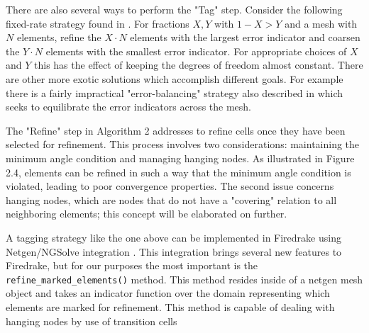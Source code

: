 \documentclass[]{interact}
\theoremstyle{plain}%
\theoremstyle{definition}
\theoremstyle{remark}
\begin{document}
There are also several ways to perform the "Tag" step. Consider the following fixed-rate strategy found in \citet[Chapter 4]{bangerth_adaptive_2003}. For fractions $X, Y$ with $1 - X > Y$ and a mesh with $N$ elements, refine the $X\cdot N$ elements with the largest error indicator and coarsen the $Y\cdot N$ elements with the smallest error indicator. For appropriate choices of $X$ and $Y$ this has the effect of keeping the degrees of freedom almost constant. There are other more exotic solutions which accomplish different goals. For example there is a fairly impractical "error-balancing" strategy also described in \citet[Chapter 4]{bangerth_adaptive_2003} which seeks to equilibrate the error indicators across the mesh.

The "Refine" step in Algorithm 2 addresses to refine cells once they have been selected for refinement. This process involves two considerations: maintaining the minimum angle condition and managing hanging nodes. As illustrated in Figure 2.4, elements can be refined in such a way that the minimum angle condition is violated, leading to poor convergence properties. The second issue concerns hanging nodes, which are nodes that do not have a "covering" relation to all neighboring elements; this concept will be elaborated on further.

A tagging strategy like the one above can be implemented in Firedrake using Netgen/NGSolve integration \citep{zerbinati_ngspetsc_nodate}.  This integration brings several new features to Firedrake, but for our purposes the most important is the \texttt{refine\_marked\_elements()} method.  This method resides inside of a netgen mesh object and takes an indicator function over the domain representing which elements are marked for refinement. This method is capable of dealing with hanging nodes by use of transition cells
\end{document}
